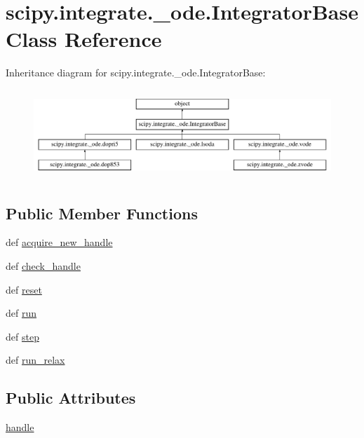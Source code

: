 \hypertarget{classscipy_1_1integrate_1_1__ode_1_1IntegratorBase}{}\section{scipy.\+integrate.\+\_\+ode.\+Integrator\+Base Class Reference}
\label{classscipy_1_1integrate_1_1__ode_1_1IntegratorBase}
Inheritance diagram for scipy.\+integrate.\+\_\+ode.\+Integrator\+Base\+:\begin{figure}[H]
\begin{center}
\leavevmode
\includegraphics[height=3.378582cm]{classscipy_1_1integrate_1_1__ode_1_1IntegratorBase}
\end{center}
\end{figure}
\subsection*{Public Member Functions}
\begin{DoxyCompactItemize}
\item 
def \hyperlink{classscipy_1_1integrate_1_1__ode_1_1IntegratorBase_a351f101b991893f65f90531731e99201}{acquire\+\_\+new\+\_\+handle}
\item 
def \hyperlink{classscipy_1_1integrate_1_1__ode_1_1IntegratorBase_a56aa4c09b69bd9707e99a465f390457a}{check\+\_\+handle}
\item 
def \hyperlink{classscipy_1_1integrate_1_1__ode_1_1IntegratorBase_a704af74447ed5b0d664f4f82c4f7adc9}{reset}
\item 
def \hyperlink{classscipy_1_1integrate_1_1__ode_1_1IntegratorBase_a5e17593e5070091676e6290a9af285c2}{run}
\item 
def \hyperlink{classscipy_1_1integrate_1_1__ode_1_1IntegratorBase_a3cee186b3d232f3f2acfa9dc752e6b0d}{step}
\item 
def \hyperlink{classscipy_1_1integrate_1_1__ode_1_1IntegratorBase_a73107d530f408f15a194052fbb1d0868}{run\+\_\+relax}
\end{DoxyCompactItemize}
\subsection*{Public Attributes}
\begin{DoxyCompactItemize}
\item 
\hyperlink{classscipy_1_1integrate_1_1__ode_1_1IntegratorBase_a107779dd791907cb9e0867db0c05388a}{handle}
\end{DoxyCompactItemize}
